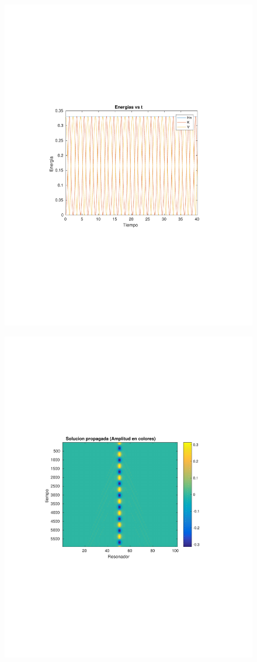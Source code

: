 \documentclass[10pt,a4paper]{article}
\begin{document}
\begin{figure}[h!]
\centering 
\includegraphics[scale=0.8]{E2-40.pdf}
\end{figure}


\begin{figure}[h!]
\centering 
\includegraphics[scale=0.8]{SP2-40.pdf}
\end{figure}
\end{document}
